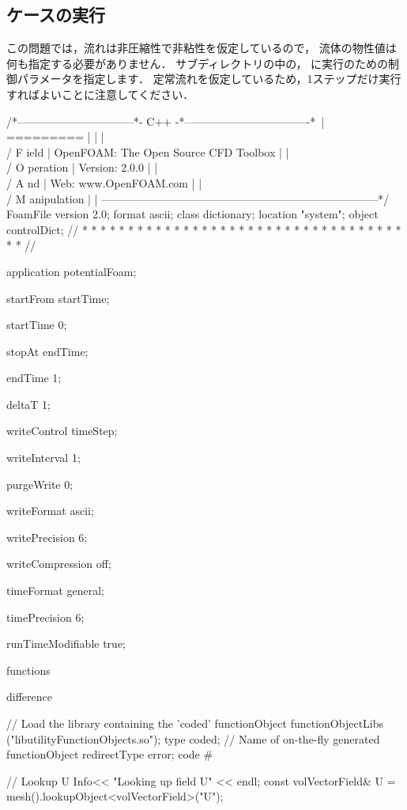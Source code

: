 \subsection{ケースの実行}
\label{ssec:3.1.5}
この問題では，流れは非圧縮性で非粘性を仮定しているので，
流体の物性値は何も指定する必要がありません．
サブディレクトリの中の，
に実行のための制御パラメータを指定します．
定常流れを仮定しているため，1ステップだけ実行すればよいことに注意してください．
\begin{OFverbatim}
/*--------------------------------*- C++ -*----------------------------------*\
| =========                 |                                                 |
| \\      /  F ield         | OpenFOAM: The Open Source CFD Toolbox           |
|  \\    /   O peration     | Version:  2.0.0                                 |
|   \\  /    A nd           | Web:      www.OpenFOAM.com                      |
|    \\/     M anipulation  |                                                 |
\*---------------------------------------------------------------------------*/
FoamFile
{
    version     2.0;
    format      ascii;
    class       dictionary;
    location    "system";
    object      controlDict;
}
// * * * * * * * * * * * * * * * * * * * * * * * * * * * * * * * * * * * * * //

application     potentialFoam;

startFrom       startTime;

startTime       0;

stopAt          endTime;

endTime         1;

deltaT          1;

writeControl    timeStep;

writeInterval   1;

purgeWrite      0;

writeFormat     ascii;

writePrecision  6;

writeCompression off;

timeFormat      general;

timePrecision   6;

runTimeModifiable true;

functions
{
    difference
    {
        // Load the library containing the 'coded' functionObject
        functionObjectLibs ("libutilityFunctionObjects.so");
        type coded;
        // Name of on-the-fly generated functionObject
        redirectType error;
        code
        #{
            // Lookup U
            Info<< "Looking up field U\n" << endl;
            const volVectorField& U = mesh().lookupObject<volVectorField>("U");

}}}
\end{OFverbatim}
